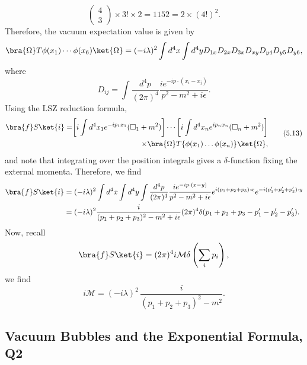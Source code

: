 \begin{solution}
\begin{equation}
\begin{pmatrix}
            4\\3
        \end{pmatrix}\times 3!\times2 = 1152 = 2\times(4!)^2.
    \end{equation}
    Therefore, the vacuum expectation value is given by
    \begin{equation}
        \bra{\Omega}T\phi(x_1)\cdots\phi(x_6)\ket{\Omega} = (-i\lambda)^2\int d^4x\int d^4yD_{1x}D_{2x}D_{3x}D_{xy}D_{y4}D_{y5}D_{y6},
    \end{equation}
    where
    \begin{equation}
        D_{ij} = \int\frac{d^4 p }{(2\pi)^4}\frac{ie^{-ip\cdot(x_i-x_j)}}{p^2-m^2+i\epsilon}.
    \end{equation}
    Using the LSZ reduction formula,
    \begin{equation}
       \begin{aligned}
                \bra{f}S\ket{i} = \biggr[ i\int d^4x_1e^{-ip_1x_1}(\square_1+m^2) \biggr] \cdots \biggr[ i\int d^4x_ne^{ip_nx_n}(\square_n+m^2) \biggr]\\
                \times \bra{\Omega}T\{\phi(x_1) \dots \phi(x_n)\}\ket{\Omega},
    \end{aligned}\tag{5.13} 
    \end{equation}
    and note that integrating over the position integrals gives a $\delta$-function fixing the external momenta. Therefore, we find
    \begin{equation}
    \begin{aligned}
        \bra{f}S\ket{i} &= (-i\lambda)^2\int d^4x \int d^4y\int\frac{d^4p}{(2\pi)^4}\frac{ie^{-ip\cdot(x-y)}}{p^2-m^2+i\epsilon}e^{i(p_1+p_2+p_3)\cdot x}e^{-i(p_1'+p_2'+p_3')\cdot y} \\
        &=(-i\lambda)^2\frac{i}{(p_1+p_2+p_3)^2-m^2+i\epsilon}(2\pi)^4\delta(p_1+p_2+p_3 - p_1'-p_2'-p_3').
    \end{aligned} 
    \end{equation}
    Now, recall 
    \begin{equation}
        \bra{f}S\ket{i} = (2\pi)^4i\mathcal{M}\delta\left(\sum_ip_i\right),
    \end{equation}
    we find
    \begin{equation}
        i\mathcal{M}= (-i\lambda)^2\,\frac{i}{(p_1+p_2+p_3)^2 - m^2}.
    \end{equation}
    
\end{solution}

\subsection{Vacuum Bubbles and the Exponential Formula, Q2}

